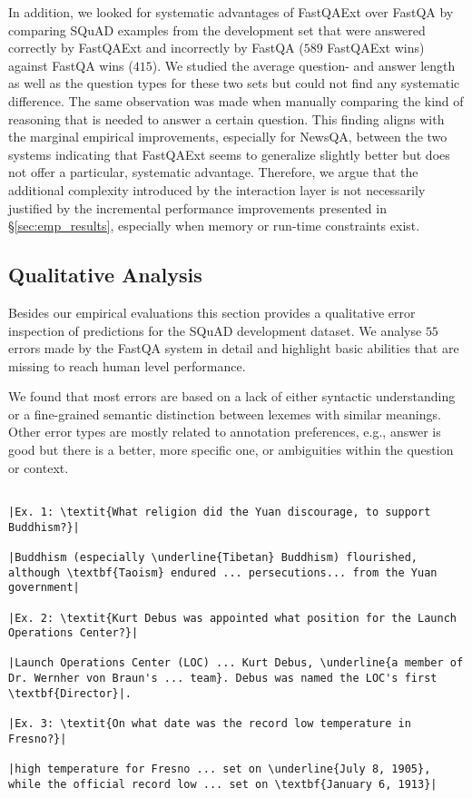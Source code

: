 \documentclass[11pt,a4paper]{article}
\begin{document}
In addition, we looked for systematic advantages of FastQAExt over FastQA by comparing SQuAD examples from the development set that were answered correctly by FastQAExt and incorrectly by FastQA ($589$ FastQAExt wins) against FastQA wins ($415$). We studied the average question- and answer length as well as the question types for these two sets but could not find any systematic difference. The same observation was made when manually comparing the kind of reasoning that is needed to answer a certain question. This finding aligns with the marginal empirical improvements, especially for NewsQA, between the two systems indicating that FastQAExt seems to generalize slightly better but does not offer a particular, systematic advantage. Therefore, we argue that the additional complexity introduced by the interaction layer is not necessarily justified by the incremental performance improvements presented in \S\ref{sec:emp_results}, especially when memory or run-time constraints exist.

\subsection{Qualitative Analysis}\label{sec:qual_ana}

Besides our empirical evaluations this section provides a qualitative error inspection of predictions for the SQuAD development dataset. We analyse $55$ errors made by the FastQA system in detail and highlight basic abilities that are missing to reach human level performance.

We found that most errors are based on a lack of either syntactic understanding or a fine-grained semantic distinction between lexemes with similar meanings. Other error types are mostly related to annotation preferences, e.g., answer is good but there is a better, more specific one, or ambiguities within the question or context. 

\begin{mdframed}[roundcorner=2pt]
\small
\begin{lstlisting}[title={\small Example FastQA errors. Predicted answers are underlined while correct answers are presented in boldface.}]

|Ex. 1: \textit{What religion did the Yuan discourage, to support Buddhism?}|

|Buddhism (especially \underline{Tibetan} Buddhism) flourished, although \textbf{Taoism} endured ... persecutions... from the Yuan government|

|Ex. 2: \textit{Kurt Debus was appointed what position for the Launch Operations Center?}|

|Launch Operations Center (LOC) ... Kurt Debus, \underline{a member of Dr. Wernher von Braun's ... team}. Debus was named the LOC's first \textbf{Director}|.

|Ex. 3: \textit{On what date was the record low temperature in Fresno?}|

|high temperature for Fresno ... set on \underline{July 8, 1905}, while the official record low ... set on \textbf{January 6, 1913}|

\end{lstlisting}

\end{mdframed}
\end{document}
